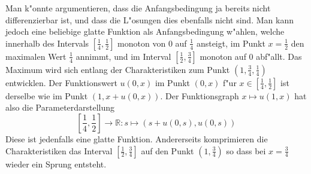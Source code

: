 Man k"onnte argumentieren, dass die Anfangsbedingung ja bereits nicht differenzierbar
ist, und dass die L"osungen dies ebenfalls nicht sind. Man kann
jedoch eine beliebige glatte Funktion als Anfangsbedingung w"ahlen, welche
innerhalb des Intervals $[\frac14,\frac12]$ monoton von $0$ auf $\frac14$ 
ansteigt, im Punkt $x=\frac12$ den maximalen Wert $\frac14$ annimmt,
und im Interval $[\frac12,\frac34]$ monoton auf $0$ abf"allt.
Das Maximum wird sich entlang der Charakteristiken zum Punkt
$(1,\frac34,\frac14)$ entwicklen. Der Funktionswert $u(0,x)$ im Punkt $(0,x)$
f"ur $x\in[\frac14,\frac12]$ ist derselbe wie im Punkt $(1,x+u(0,x))$.
Der Funktionsgraph $x\mapsto u(1,x)$ hat also die Parameterdarstellung
$$[{\textstyle\frac14},{\textstyle\frac12}]\to\mathbb R\colon s\mapsto (s+u(0,s),u(0,s))$$
Diese ist jedenfalls eine glatte Funktion. Andererseits komprimieren
die Charakteristiken das Interval $[\frac12,\frac34]$ auf
den Punkt $(1,\frac34)$ so dass bei $x=\frac34$ wieder ein Sprung entsteht.

